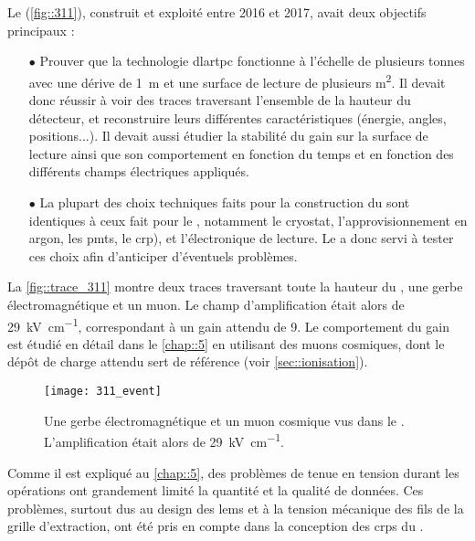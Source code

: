       Le \TOO{} (\autoref{fig::311}), construit et exploité entre 2016 et 2017, avait deux objectifs principaux :
      \begin{itemize}
        \item[$\bullet$] Prouver que la technologie \gls{dlartpc} fonctionne à l'échelle de plusieurs tonnes avec une dérive de \SI{1}{\meter} et une surface de lecture de plusieurs \si{\meter\squared}. Il devait donc réussir à voir des traces traversant l'ensemble de la hauteur du détecteur, et reconstruire leurs différentes caractéristiques (énergie, angles, positions...). Il devait aussi étudier la stabilité du gain sur la surface de lecture ainsi que son comportement en fonction du temps et en fonction des différents champs électriques appliqués.
        \item[$\bullet$] La plupart des choix techniques faits pour la construction du \TOO{} sont identiques à ceux fait pour le \SSS{}, notamment le cryostat, l'approvisionnement en argon, les \glspl{pmt}, le \gls{crp}), et l'électronique de lecture. Le \TOO{} a donc servi à tester ces choix afin d'anticiper d'éventuels problèmes.
      \end{itemize}
      
      La \autoref{fig::trace_311} montre deux traces traversant toute la hauteur du \TOO{}, une gerbe électromagnétique et un muon. Le champ d'amplification était alors de \SI{29}{\kilo\volt\per\centi\meter}, correspondant à un gain attendu de 9. Le comportement du gain est étudié en détail dans le \autoref{chap::5} en utilisant des muons cosmiques, dont le dépôt de charge attendu sert de référence (voir \autoref{sec::ionisation}).

      \begin{figure}[!htb]
        \centering
        \texttt{[image: 311\_event]}        
        \caption[Quelques événements vus dans le  \TOO{}]{\label{fig::trace_311}Une gerbe électromagnétique et un muon cosmique vus dans le \TOO{}. L'amplification était alors de \SI{29}{\kilo\volt\per\centi\meter}.}
      \end{figure}

      Comme il est expliqué au \autoref{chap::5}, des problèmes de tenue en tension durant les opérations ont grandement limité la quantité et la qualité de données. Ces problèmes, surtout dus au design des \glspl{lem} et à la tension mécanique des fils de la grille d'extraction, ont été pris en compte dans la conception des \glspl{crp} du \SSS{}.

